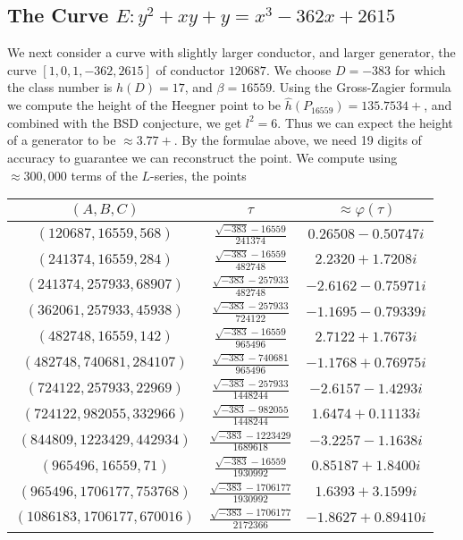\subsection{The Curve $E:y^2 + xy + y = x^3 - 362x + 2615$}
We next consider a curve with slightly larger conductor, and larger generator, the curve $[1, 0, 1, -362, 2615]$ of conductor $120687$. We choose $D = -383$ for which the class number is $h(D) = 17$, and  $\beta = 16559$. Using the Gross-Zagier formula we compute the height of the Heegner point to be $\hat{h}(P_{16559}) = 135.7534+$, and combined with the BSD conjecture, we get $l^2 = 6$. Thus we can expect the height of a generator to be $ \approx 3.77+$. By the formulae above, we need 19 digits of accuracy to guarantee we can reconstruct the point.  We compute using $\approx 300,000$ terms of the $L$-series, the points 
\begin{center}
\begin{tabular}{| c | c | c |}
\hline
$(A,B,C)$ & $\tau$ & $\approx\varphi(\tau)$ \\
\hline
$(120687, 16559, 568)$ & $\frac{\sqrt{-383} - 16559}{241374}$ & $0.26508 - 0.50747i$\\
$(241374, 16559, 284)$ & $\frac{\sqrt{-383} - 16559}{482748}$ & $2.2320 + 1.7208i$\\
$(241374, 257933, 68907)$ & $\frac{\sqrt{-383} - 257933}{482748}$ & $-2.6162 - 0.75971i$\\
$(362061, 257933, 45938)$ & $\frac{\sqrt{-383} - 257933}{724122}$ & $-1.1695 - 0.79339i$\\
$(482748, 16559, 142)$ & $\frac{\sqrt{-383} - 16559}{965496}$ & $2.7122 + 1.7673i$\\
$(482748, 740681, 284107)$ & $\frac{\sqrt{-383} - 740681}{965496}$ & $-1.1768 + 0.76975i$\\
$(724122, 257933, 22969)$ & $\frac{\sqrt{-383} - 257933}{1448244}$ & $-2.6157 - 1.4293i$\\
$(724122, 982055, 332966)$ & $\frac{\sqrt{-383} - 982055}{1448244}$ & $1.6474 + 0.11133i$\\
$(844809, 1223429, 442934)$ & $\frac{\sqrt{-383} - 1223429}{1689618}$ & $-3.2257 - 1.1638i$\\
$(965496, 16559, 71)$ & $\frac{\sqrt{-383} - 16559}{1930992}$ & $0.85187 + 1.8400i$\\
$(965496, 1706177, 753768)$ & $\frac{\sqrt{-383} - 1706177}{1930992}$ & $1.6393 + 3.1599i$\\
$(1086183, 1706177, 670016)$ & $\frac{\sqrt{-383} - 1706177}{2172366}$ & $-1.8627 + 0.89410i$\\

\end{tabular}
\end{center}
